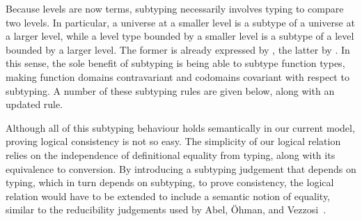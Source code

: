 \documentclass[a4paper,UKenglish,cleveref,autoref,thm-restate]{lipics-v2021}
\newcommand{\citep}[1]{\cite{#1}}
\begin{document}
Because levels are now terms,
subtyping necessarily involves typing to compare two levels.
In particular, a universe at a smaller level is a subtype of a universe at a larger level,
while a level type bounded by a smaller level is a subtype of a level bounded by a larger level.
The former is already expressed by , the latter by .
In this sense, the sole benefit of subtyping is being able to subtype function types,
making function domains contravariant and codomains covariant with respect to subtyping.
A number of these subtyping rules are given below,
along with an updated  rule.
%

Although all of this subtyping behaviour holds semantically in our current model,
proving logical consistency is not so easy.
The simplicity of our logical relation relies on
the independence of definitional equality from typing,
along with its equivalence to conversion.
By introducing a subtyping judgement that depends on typing,
which in turn depends on subtyping, to prove consistency,
the logical relation would have to be extended to include a semantic notion of equality,
similar to the reducibility judgements used by Abel, \"Ohman, and Vezzosi~\citep{dec-conv}.
\end{document}
